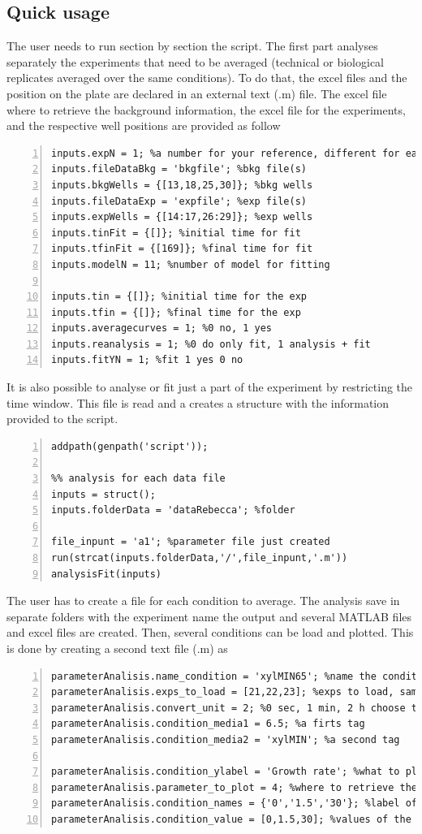 \documentclass{article}
\begin{document}
\subsection{Quick usage}
The user needs to run section by section the script. The first part analyses separately the experiments that need to be averaged (technical or biological replicates averaged over the same conditions). To do that, the excel files and the position on the plate are declared in an external text (.m) file. The excel file where to retrieve the background information, the excel file for the experiments, and the respective well positions are provided as follow 
\begin{lstlisting}[frame=single,numbers=left,style=Matlab-Pyglike]
inputs.expN = 1; %a number for your reference, different for each analysis
inputs.fileDataBkg = 'bkgfile'; %bkg file(s)
inputs.bkgWells = {[13,18,25,30]}; %bkg wells
inputs.fileDataExp = 'expfile'; %exp file(s)
inputs.expWells = {[14:17,26:29]}; %exp wells
inputs.tinFit = {[]}; %initial time for fit
inputs.tfinFit = {[169]}; %final time for fit
inputs.modelN = 11; %number of model for fitting

inputs.tin = {[]}; %initial time for the exp
inputs.tfin = {[]}; %final time for the exp
inputs.averagecurves = 1; %0 no, 1 yes
inputs.reanalysis = 1; %0 do only fit, 1 analysis + fit
inputs.fitYN = 1; %fit 1 yes 0 no
\end{lstlisting}
It is also possible to analyse or fit just a part of the experiment by restricting the time window. This file is read and a creates a structure with the information provided to the script.
\begin{lstlisting}[frame=single,numbers=left,style=Matlab-Pyglike]
%% add script and data folders
addpath(genpath('script'));

%% analysis for each data file
inputs = struct();
inputs.folderData = 'dataRebecca'; %folder

file_inpunt = 'a1'; %parameter file just created
run(strcat(inputs.folderData,'/',file_inpunt,'.m'))
analysisFit(inputs)
\end{lstlisting}
The user has to create a file for each condition to average. The analysis save in separate folders with the experiment name the output and several MATLAB files and excel files are created. Then, several conditions can be load and plotted. This is done by creating a second text file (.m) as
\begin{lstlisting}[frame=single,numbers=left,style=Matlab-Pyglike]
parameterAnalisis.name_condition = 'xylMIN65'; %name the condition
parameterAnalisis.exps_to_load = [21,22,23]; %exps to load, same name as they where saved
parameterAnalisis.convert_unit = 2; %0 sec, 1 min, 2 h choose the time unit
parameterAnalisis.condition_media1 = 6.5; %a firts tag 
parameterAnalisis.condition_media2 = 'xylMIN'; %a second tag

parameterAnalisis.condition_ylabel = 'Growth rate'; %what to plot
parameterAnalisis.parameter_to_plot = 4; %where to retrieve the data to plot
parameterAnalisis.condition_names = {'0','1.5','30'}; %label of the plot
parameterAnalisis.condition_value = [0,1.5,30]; %values of the label
\end{lstlisting}
\end{document}
